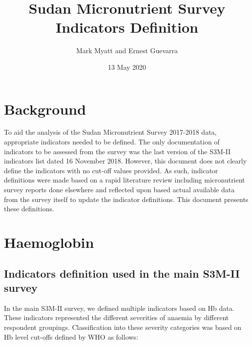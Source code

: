 \documentclass[12pt,a4paper]{article}
\title{\vspace{8cm} \LARGE{Sudan Micronutrient Survey Indicators Definition}}
\author{Mark Myatt and Ernest Guevarra}
\date{13 May 2020}
\begin{document}
\maketitle

\newpage

\newpage

\hypertarget{background}{%
\section{Background}\label{background}}

To aid the analysis of the Sudan Micronutrient Survey 2017-2018 data, appropriate indicators needed to be defined. The only documentation of indicators to be assessed from the survey was the last version of the S3M-II indicators list dated 16 November 2018. However, this document does not clearly define the indicators with no cut-off values provided. As such, indicator definitions were made based on a rapid literature review including micronutrient survey reports done elsewhere and reflected upon based actual available data from the survey itself to update the indicator definitions. This document presents these definitions.

\hypertarget{haemoglobin}{%
\section{Haemoglobin}\label{haemoglobin}}

\hypertarget{indicators-definition-used-in-the-main-s3m-ii-survey}{%
\subsection{Indicators definition used in the main S3M-II survey}\label{indicators-definition-used-in-the-main-s3m-ii-survey}}

In the main S3M-II survey, we defined multiple indicators based on Hb data. These indicators represented the different severities of anaemia by different respondent groupings. Classification into these severity categories was based on Hb level cut-offs defined by WHO \citep{WorldHealthOrganization:2007tx, WorldHealthOrganization:2011ut} as follows:
\end{document}
